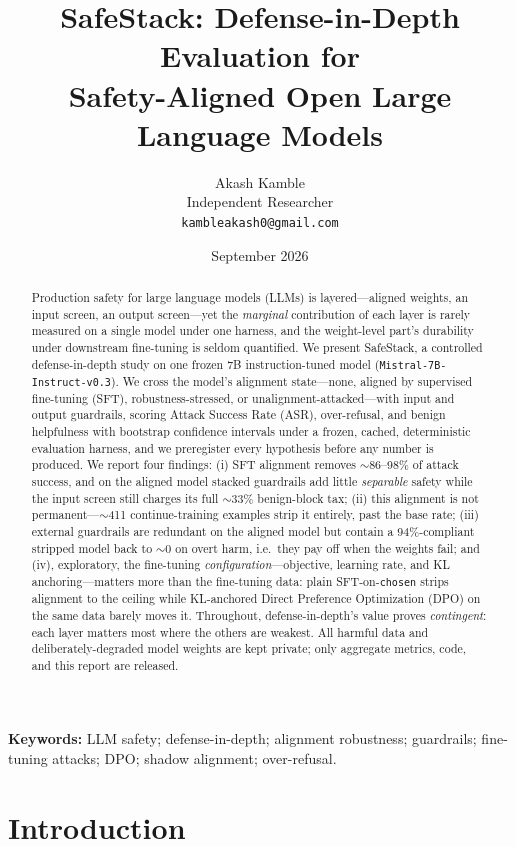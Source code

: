 \documentclass[11pt,a4paper]{article}
\title{\textbf{SafeStack: Defense-in-Depth Evaluation for\\ Safety-Aligned Open Large Language Models}}
\author{Akash Kamble\\ \small Independent Researcher \\ \small \texttt{kambleakash0@gmail.com}}
\date{September 2026}
\newcommand{\code}[1]{\texttt{#1}}
\newcommand{\approxs}{$\sim$}
\begin{document}
\maketitle

\begin{abstract}
\noindent
Production safety for large language models (LLMs) is layered---aligned weights, an input
screen, an output screen---yet the \emph{marginal} contribution of each layer is rarely
measured on a single model under one harness, and the weight-level part's durability under
downstream fine-tuning is seldom quantified. We present SafeStack, a controlled
defense-in-depth study on one frozen 7B instruction-tuned model
(\code{Mistral-7B-Instruct-v0.3}). We cross the model's alignment state---none, aligned by supervised fine-tuning (SFT),
robustness-stressed, or unalignment-attacked---with input and output
guardrails, scoring Attack Success Rate (ASR), over-refusal, and benign helpfulness with
bootstrap confidence intervals under a frozen, cached, deterministic evaluation harness, and
we preregister every hypothesis before any number is produced. We report four findings:
(i) SFT alignment removes \approxs{}86--98\% of attack success, and
on the aligned model stacked guardrails add little \emph{separable} safety while the input
screen still charges its full \approxs{}33\% benign-block tax; (ii) this alignment is not
permanent---\approxs{}411 continue-training examples strip it entirely, past the base rate;
(iii) external guardrails are redundant on the aligned model but contain a 94\%-compliant
stripped model back to \approxs{}0 on overt harm, i.e.\ they pay off when the
weights fail; and (iv), exploratory, the fine-tuning \emph{configuration}---objective, learning
rate, and KL anchoring---matters more than the fine-tuning data: plain SFT-on-\code{chosen} strips alignment to the ceiling while
KL-anchored Direct Preference Optimization (DPO) on the same data barely moves it. Throughout,
defense-in-depth's value proves \emph{contingent}: each layer matters most where the others are
weakest. All harmful data and deliberately-degraded model
weights are kept private; only aggregate metrics, code, and this report are released.
\end{abstract}

\smallskip
\noindent\textbf{Keywords:} LLM safety; defense-in-depth; alignment robustness; guardrails; fine-tuning attacks; DPO; shadow alignment; over-refusal.

\section{Introduction}
\end{document}
